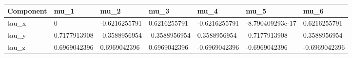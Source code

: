 \begin{tabular}{@{}lllllll@{}}
\toprule
Component & mu\_1 & mu\_2 & mu\_3 & mu\_4 & mu\_5 & mu\_6 \\
\midrule
tau\_x & 0 & -0.6216255791 & 0.6216255791 & -0.6216255791 & -8.790409293e-17 & 0.6216255791 \\
tau\_y & 0.7177913908 & -0.3588956954 & -0.3588956954 & 0.3588956954 & -0.7177913908 & 0.3588956954 \\
tau\_z & 0.6969042396 & 0.6969042396 & 0.6969042396 & -0.6969042396 & -0.6969042396 & -0.6969042396 \\
\bottomrule
\end{tabular}
